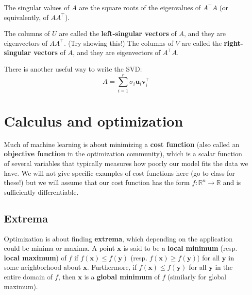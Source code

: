 \documentclass{article}
\newcommand{\R}{\mathbb{R}}
\renewcommand{\vec}[1]{\mathbf{#1}}
\newcommand{\tran}{^\top}
\newcommand{\term}[1]{\textbf{#1}}
\begin{document}
The singular values of $A$ are the square roots of the eigenvalues of $A\tran A$ (or equivalently, of $AA\tran$).

The columns of $U$ are called the \term{left-singular vectors} of $A$, and they are eigenvectors of $AA\tran$. (Try showing this!) The columns of $V$ are called the \term{right-singular vectors} of $A$, and they are eigenvectors of $A\tran A$.

There is another useful way to write the SVD:
\[A = \sum_{i=1}^r \sigma_i \vec{u}_i\vec{v}_i\tran\]

\newpage
\section{Calculus and optimization}
Much of machine learning is about minimizing a \term{cost function} (also called an \term{objective function} in the optimization community), which is a scalar function of several variables that typically measures how poorly our model fits the data we have. We will not give specific examples of cost functions here (go to class for these!) but we will assume that our cost function has the form $f : \R^n \to \R$ and is sufficiently differentiable.

\subsection{Extrema}
Optimization is about finding \term{extrema}, which depending on the application could be minima or maxima. A point $\vec{x}$ is said to be a \term{local minimum} (resp. \term{local maximum}) of $f$ if $f(\vec{x}) \leq f(\vec{y})$ (resp. $f(\vec{x}) \geq f(\vec{y})$) for all $\vec{y}$ in some neighborhood about $\vec{x}$. Furthermore, if $f(\vec{x}) \leq f(\vec{y})$ for all $\vec{y}$ in the entire domain of $f$, then $\vec{x}$ is a \term{global minimum} of $f$ (similarly for global maximum).
\end{document}

